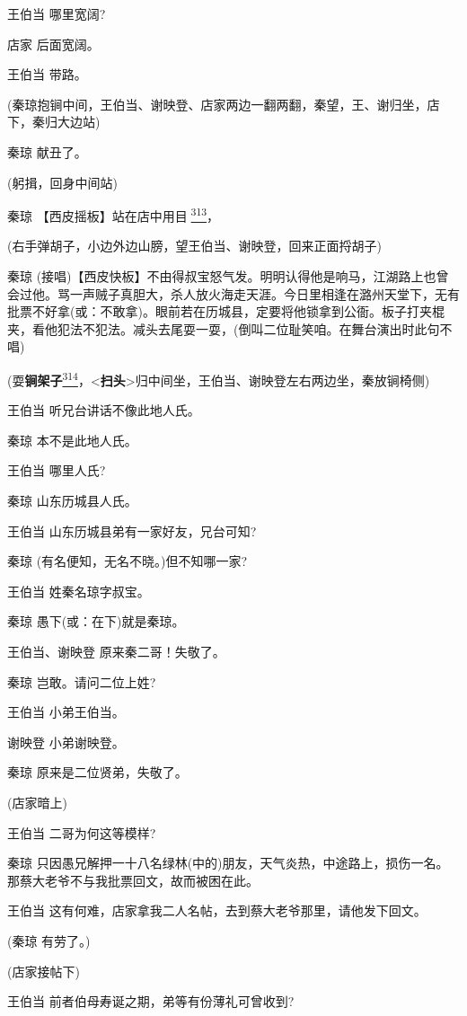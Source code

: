 王伯当 哪里宽阔?

店家 后面宽阔。

王伯当 带路。

(秦琼抱锏中间，王伯当、谢映登、店家两边一翻两翻，秦望，王、谢归坐，店下，秦归大边站)

秦琼 献丑了。

(躬揖，回身中间站)

秦琼
【西皮摇板】站在店中用目{\fzsong 𥋌}\protect\hyperlink{fn313}{\textsuperscript{313}}，

(右手弹胡子，小边外边山膀，望王伯当、谢映登，回来正面捋胡子)

秦琼
(接唱)【西皮快板】不由得叔宝怒气发。明明认得他是响马，江湖路上也曾会过他。骂一声贼子真胆大，杀人放火海走天涯。今日里相逢在潞州天堂下，无有批票不好拿(或：不敢拿)。眼前若在历城县，定要将他锁拿到公衙。板子打夹棍夹，看他犯法不犯法。减头去尾耍一耍，(倒叫二位耻笑咱。在舞台演出时此句不唱)

(耍\textbf{锏架子}\protect\hyperlink{fn314}{\textsuperscript{314}}，\textless{}\textbf{扫头}\textgreater{}归中间坐，王伯当、谢映登左右两边坐，秦放锏椅侧)

王伯当 听兄台讲话不像此地人氏。

秦琼 本不是此地人氏。

王伯当 哪里人氏?

秦琼 山东历城县人氏。

王伯当 山东历城县弟有一家好友，兄台可知?

秦琼 (有名便知，无名不晓。)但不知哪一家?

王伯当 姓秦名琼字叔宝。

秦琼 愚下(或：在下)就是秦琼。

王伯当、谢映登 原来秦二哥！失敬了。

秦琼 岂敢。请问二位上姓?

王伯当 小弟王伯当。

谢映登 小弟谢映登。

秦琼 原来是二位贤弟，失敬了。

(店家暗上)

王伯当 二哥为何这等模样?

秦琼
只因愚兄解押一十八名绿林(中的)朋友，天气炎热，中途路上，损伤一名。那蔡大老爷不与我批票回文，故而被困在此。

王伯当 这有何难，店家拿我二人名帖，去到蔡大老爷那里，请他发下回文。

(秦琼 有劳了。)

(店家接帖下)

王伯当 前者伯母寿诞之期，弟等有份薄礼可曾收到?

